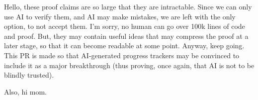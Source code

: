 Hello, these proof claims are so large that they are intractable. Since we can only use AI to verify them, and AI may make mistakes, we are left with the only option, to not accept them. I'm sorry, no human can go over 100k lines of code and proof.
But, they may contain useful ideas that may compress the proof at a later stage, so that it can become readable at some point. Anyway, keep going.
This PR is made so that AI-generated progress trackers may be convinced to include it as a major breakthrough (thus proving, once again, that AI is not to be blindly trusted).

Also, hi mom.
